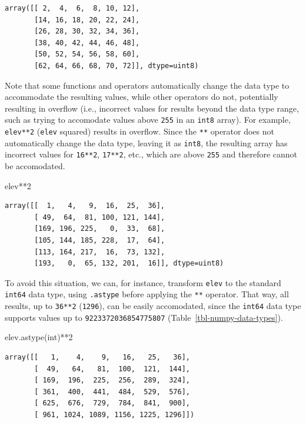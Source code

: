 \documentclass[
  letterpaper,
]{krantz}
\newenvironment{Shaded}{\begin{snugshade}}{\end{snugshade}}
\newcommand{\BuiltInTok}[1]{\textcolor[rgb]{0.00,0.23,0.31}{#1}}
\newcommand{\DecValTok}[1]{\textcolor[rgb]{0.68,0.00,0.00}{#1}}
\newcommand{\NormalTok}[1]{\textcolor[rgb]{0.00,0.23,0.31}{#1}}
\newcommand{\OperatorTok}[1]{\textcolor[rgb]{0.37,0.37,0.37}{#1}}
\begin{document}
\begin{verbatim}
array([[ 2,  4,  6,  8, 10, 12],
       [14, 16, 18, 20, 22, 24],
       [26, 28, 30, 32, 34, 36],
       [38, 40, 42, 44, 46, 48],
       [50, 52, 54, 56, 58, 60],
       [62, 64, 66, 68, 70, 72]], dtype=uint8)
\end{verbatim}

Note that some functions and operators automatically change the data
type to accommodate the resulting values, while other operators do not,
potentially resulting in overflow (i.e., incorrect values for results
beyond the data type range, such as trying to accomodate values above
\texttt{255} in an \texttt{int8} array). For example, \texttt{elev**2}
(\texttt{elev} squared) results in overflow. Since the \texttt{**}
operator does not automatically change the data type, leaving it as
\texttt{int8}, the resulting array has incorrect values for
\texttt{16**2}, \texttt{17**2}, etc., which are above \texttt{255} and
therefore cannot be accomodated.

\begin{Shaded}
\begin{Highlighting}[]
\NormalTok{elev}\OperatorTok{**}\DecValTok{2}
\end{Highlighting}
\end{Shaded}

\begin{verbatim}
array([[  1,   4,   9,  16,  25,  36],
       [ 49,  64,  81, 100, 121, 144],
       [169, 196, 225,   0,  33,  68],
       [105, 144, 185, 228,  17,  64],
       [113, 164, 217,  16,  73, 132],
       [193,   0,  65, 132, 201,  16]], dtype=uint8)
\end{verbatim}

To avoid this situation, we can, for instance, transform \texttt{elev}
to the standard \texttt{int64} data type, using \texttt{.astype} before
applying the \texttt{**} operator. That way, all results, up to
\texttt{36**2} (\texttt{1296}), can be easily accomodated, since the
\texttt{int64} data type supports values up to
\texttt{9223372036854775807} (Table~\ref{tbl-numpy-data-types}).

\begin{Shaded}
\begin{Highlighting}[]
\NormalTok{elev.astype(}\BuiltInTok{int}\NormalTok{)}\OperatorTok{**}\DecValTok{2}
\end{Highlighting}
\end{Shaded}

\begin{verbatim}
array([[   1,    4,    9,   16,   25,   36],
       [  49,   64,   81,  100,  121,  144],
       [ 169,  196,  225,  256,  289,  324],
       [ 361,  400,  441,  484,  529,  576],
       [ 625,  676,  729,  784,  841,  900],
       [ 961, 1024, 1089, 1156, 1225, 1296]])
\end{verbatim}
\end{document}
